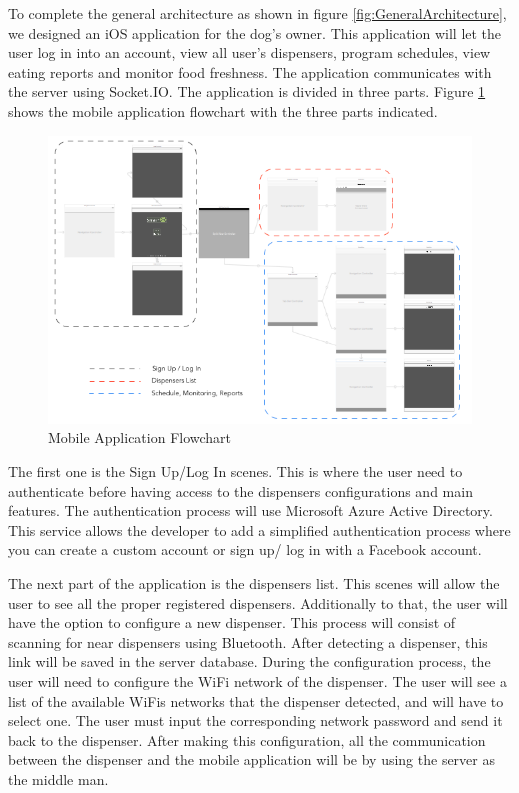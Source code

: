 \documentclass[12pt]{article}
\begin{document}
To complete the general architecture as shown in figure \ref{fig:GeneralArchitecture}, we designed an iOS application for the dog's owner. This application will let the user log in into an account, view all user's dispensers, program schedules, view eating reports and monitor food freshness. The application communicates with the server using Socket.IO. The application is divided in three parts. Figure \ref{fig:AppFlowchart} shows the mobile application flowchart with the three parts indicated.

\begin{figure}[!htb]
  \includegraphics[scale=0.6]{Figures/MobileAppScenes}
  \caption{Mobile Application Flowchart}
  \label{fig:AppFlowchart}
\end{figure}

The first one is the Sign Up/Log In scenes. This is where the user need to authenticate before having access to the dispensers configurations and main features. The authentication process will use Microsoft Azure Active Directory\cite{Vilcinskas2016}. This service allows the developer to add a simplified authentication process where you can create a custom account or sign up/ log in with a Facebook account.

The next part of the application is the dispensers list. This scenes will allow the user to see all the proper registered dispensers. Additionally to that, the user will have the option to configure a new dispenser. This process will consist of scanning for near dispensers using Bluetooth. After detecting a dispenser, this link will be saved in the server database. During the configuration process, the user will need to configure the  WiFi network of the dispenser. The user will see a list of the available WiFis networks that the dispenser detected, and will have to select one. The user must input the corresponding network password and send it back to the dispenser. After making this configuration, all the communication between the dispenser and the mobile application will be by using the server as the middle man.
\end{document}
